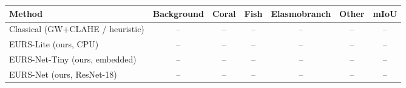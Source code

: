 \begin{tabular}{lcccccc}
\toprule
Method & Background & Coral & Fish & Elasmobranch & Other & mIoU \\
\midrule
Classical (GW+CLAHE / heuristic) & -- & -- & -- & -- & -- & -- \\
EURS-Lite (ours, CPU) & -- & -- & -- & -- & -- & -- \\
EURS-Net-Tiny (ours, embedded) & -- & -- & -- & -- & -- & -- \\
EURS-Net (ours, ResNet-18) & -- & -- & -- & -- & -- & -- \\
\bottomrule
\end{tabular}
